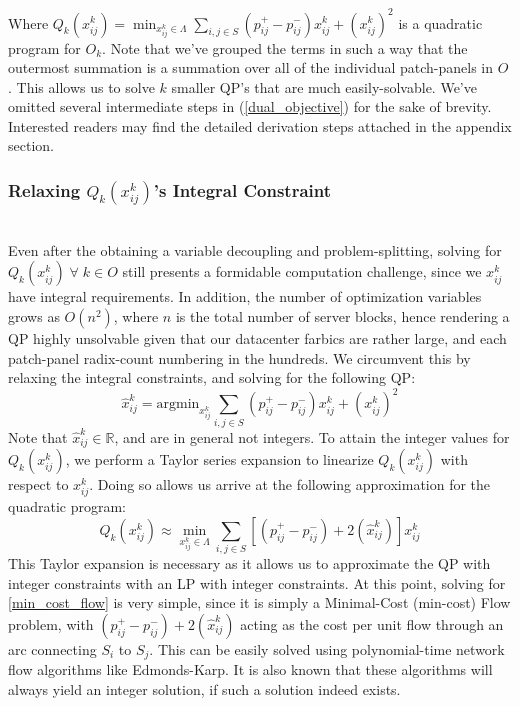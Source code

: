 \documentclass[sigconf]{acmart}
\begin{document}
Where $Q_k(x_{ij}^k) = \min_{x_{ij}^k \in \Lambda} \sum_{i, j \in S} (p_{ij}^+ - p_{ij}^-)x_{ij}^k + (x_{ij}^k)^2$ is a quadratic program for $O_k$. Note that we've grouped the terms in such a way that the outermost summation is a summation over all of the individual patch-panels in $O$. This allows us to solve $k$ smaller QP's that are much easily-solvable. We've omitted several intermediate steps in (\ref{dual_objective}) for the sake of brevity. Interested readers may find the detailed derivation steps attached in the appendix section.

\subsubsection{Relaxing $Q_k(x_{ij}^k)$'s Integral Constraint}\text{\\}
\\Even after the obtaining a variable decoupling and problem-splitting, solving for $Q_k(x_{ij}^k) \; \forall \; k \in O$ still presents a formidable computation challenge, since we $x_{ij}^k$ have integral requirements. In addition, the number of optimization variables grows as $O(n^2)$, where $n$ is the total number of server blocks, hence rendering a QP highly unsolvable given that our datacenter farbics are rather large, and each patch-panel radix-count numbering in the hundreds. We circumvent this by relaxing the integral constraints, and solving for the following QP: 
\begin{equation}\label{optimal_fractional_ocs_solution}
\hat{x}_{ij}^{k} = \text{argmin}_{x_{ij}^k} \sum_{i, j \in S} (p_{ij}^+ - p_{ij}^-)x_{ij}^k + (x_{ij}^k)^2
\end{equation}
Note that $\hat{x}_{ij}^{k} \in \mathbb{R}$, and are in general not integers. To attain the integer values for $Q_k(x_{ij}^k)$, we perform a Taylor series expansion to linearize $Q_k(x_{ij}^k)$ with respect to $x_{ij}^k$. Doing so allows us arrive at the following approximation for the quadratic program:
\begin{equation}\label{min_cost_flow}
    Q_{k}(x_{ij}^k) \approx \min_{x_{ij}^k \in \Lambda} \sum_{i, j \in S} [(p_{ij}^+ - p_{ij}^-)+ 2(\hat{x}_{ij}^{k})] x_{ij}^k
\end{equation}
This Taylor expansion is necessary as it allows us to approximate the QP with integer constraints with an LP with integer constraints. At this point, solving for \ref{min_cost_flow} is very simple, since it is simply a Minimal-Cost (min-cost) Flow problem, with $(p_{ij}^+ - p_{ij}^-)+ 2(\hat{x}_{ij}^k)$ acting as the cost per unit flow through an arc connecting $S_i$ to $S_j$. This can be easily solved using polynomial-time network flow algorithms like Edmonds-Karp. It is also known that these algorithms will always yield an integer solution, if such a solution indeed exists.
\end{document}
